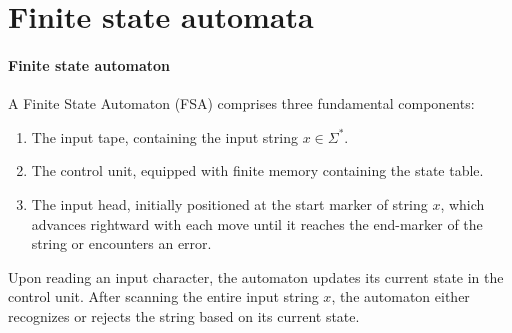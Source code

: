\section{Finite state automata}

\paragraph*{Finite state automaton}
A Finite State Automaton (FSA) comprises three fundamental components:
\begin{enumerate}
    \item The input tape, containing the input string $x \in \Sigma^{*}$.
    \item The control unit, equipped with finite memory containing the state table.
    \item The input head, initially positioned at the start marker of string $x$, which advances rightward with each move until it reaches the end-marker of the string or encounters an error.
\end{enumerate}
Upon reading an input character, the automaton updates its current state in the control unit.
After scanning the entire input string $x$, the automaton either recognizes or rejects the string based on its current state.

